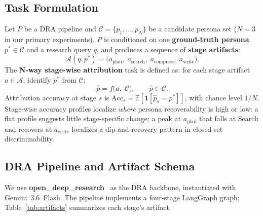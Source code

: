 \documentclass[]{article}
\begin{document}
\subsection{Task Formulation}

Let $P$ be a DRA pipeline and $\mathcal{C} = \{p_1, \dots, p_N\}$ be a candidate persona set ($N=3$ in our primary experiments).
$P$ is conditioned on one \textbf{ground-truth persona} $p^* \in \mathcal{C}$ and a research query $q$, and produces a sequence of \textbf{stage artifacts}:
\begin{equation}
  \mathcal{A}(q, p^*) = \bigl(a_{\text{plan}},\; a_{\text{search}},\; a_{\text{compress}},\; a_{\text{write}}\bigr).
\end{equation}
The \textbf{N-way stage-wise attribution} task is defined as: for each stage artifact $a \in \mathcal{A}$, identify $p^*$ from $\mathcal{C}$:
\begin{equation}
  \hat{p} = f\bigl(a,\; \mathcal{C}\bigr), \qquad \hat{p} \in \mathcal{C}.
\end{equation}
Attribution accuracy at stage $s$ is $\mathrm{Acc}_s = \mathbb{E}[\mathbf{1}[\hat{p}_s = p^*]]$, with chance level $1/N$.
Stage-wise accuracy profiles localize \emph{where} persona recoverability is
high or low: a flat profile suggests little stage-specific change; a peak at
$a_{\text{plan}}$ that falls at Search and recovers at $a_{\text{write}}$
localizes a dip-and-recovery pattern in closed-set discriminability.

\subsection{DRA Pipeline and Artifact Schema}

We use \textbf{open\_deep\_research}~\cite{open-deep-research} as the DRA backbone, instantiated with Gemini~3.6~Flash.
The pipeline implements a four-stage LangGraph graph; Table~\ref{tab:artifacts} summarizes each stage's artifact.

\begin{table}[t]
\centering
\small
\setlength{\tabcolsep}{3pt}
\caption{Four stage artifacts captured per DRA run.}
\label{tab:artifacts}
\end{table}
\end{document}
